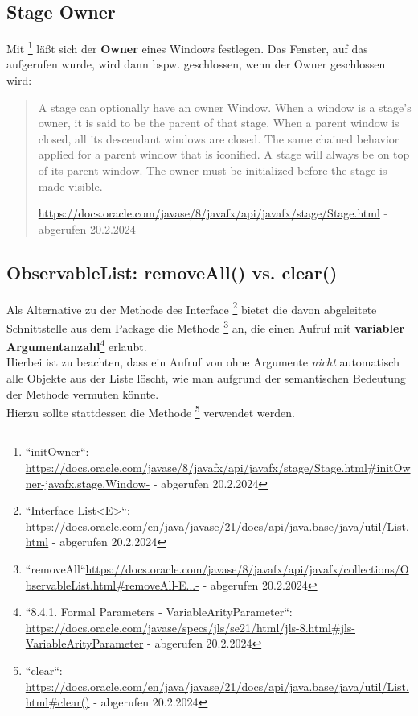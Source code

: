 \subsection*{Stage Owner}

Mit \footnote{
``initOwner``: \url{https://docs.oracle.com/javase/8/javafx/api/javafx/stage/Stage.html#initOwner-javafx.stage.Window-} - abgerufen 20.2.2024
} läßt sich der \textbf{Owner} eines Windows festlegen.
Das Fenster, auf das  aufgerufen wurde, wird dann bspw. geschlossen, wenn der Owner geschlossen wird:

\blockquote[{\url{https://docs.oracle.com/javase/8/javafx/api/javafx/stage/Stage.html} - abgerufen 20.2.2024}]{
    A stage can optionally have an owner Window. When a window is a stage's owner, it is said to be the parent of that stage. When a parent window is closed, all its descendant windows are closed. The same chained behavior applied for a parent window that is iconified. A stage will always be on top of its parent window. The owner must be initialized before the stage is made visible.
}

\subsection*{ObservableList: removeAll() vs. clear()}

Als Alternative zu der Methode  des Interface \footnote{
``Interface List<E>``: \url{https://docs.oracle.com/en/java/javase/21/docs/api/java.base/java/util/List.html} - abgerufen 20.2.2024
} bietet die davon abgeleitete Schnittstelle  aus dem Package  die Methode
\footnote{
    ``removeAll``\url{https://docs.oracle.com/javase/8/javafx/api/javafx/collections/ObservableList.html#removeAll-E...-} - abgerufen 20.2.2024
} an, die einen Aufruf mit \textbf{variabler Argumentanzahl}\footnote{
    ``8.4.1. Formal Parameters - VariableArityParameter``:  \url{https://docs.oracle.com/javase/specs/jls/se21/html/jls-8.html#jls-VariableArityParameter} - abgerufen 20.2.2024
} erlaubt.\\

\noindent
Hierbei ist zu beachten, dass ein Aufruf von  ohne Argumente \textit{nicht} automatisch alle Objekte aus der Liste löscht, wie man aufgrund der semantischen Bedeutung der Methode vermuten könnte.\\
Hierzu sollte stattdessen die Methode \footnote{
``clear``: \url{https://docs.oracle.com/en/java/javase/21/docs/api/java.base/java/util/List.html#clear()} - abgerufen 20.2.2024
} verwendet werden.
